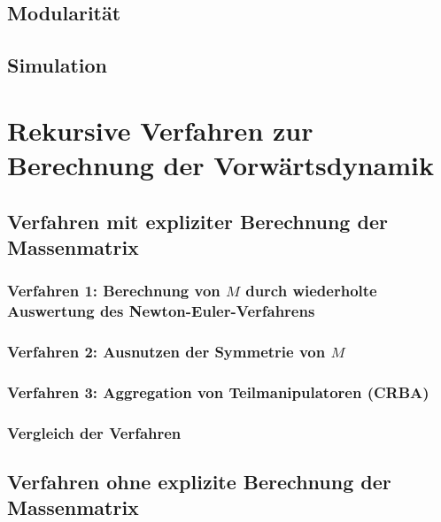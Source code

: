 \documentclass[a4paper, 11pt, accentcolor = tud3b]{tudreport}
\begin{document}
			\subsection{Modularität} %

			\subsection{Simulation} %

		\section{Rekursive Verfahren zur Berechnung der Vorwärtsdynamik} %

			\subsection{Verfahren mit expliziter Berechnung der Massenmatrix} %

				\subsubsection{Verfahren 1: Berechnung von \(M\) durch wiederholte Auswertung des Newton-Euler-Verfahrens} %

				\subsubsection{Verfahren 2: Ausnutzen der Symmetrie von \(M\)} %

				\subsubsection{Verfahren 3: Aggregation von Teilmanipulatoren (CRBA)} %

				\subsubsection{Vergleich der Verfahren} %

			\subsection{Verfahren ohne explizite Berechnung der Massenmatrix} %
\end{document}
